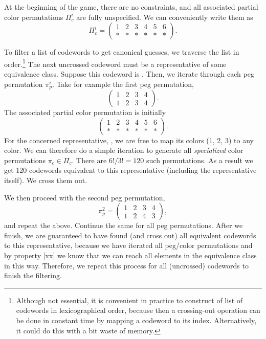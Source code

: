 At the beginning of the game, there are no constraints, and all associated partial color permutations $\Pi_c^i$ are fully unspecified. We can conveniently write them as
\[
\Pi_c^i = 
\begin{pmatrix}
1 & 2 & 3 & 4 & 5 & 6 \\
* & * & * & * & * & * 
\end{pmatrix} .
\]

To filter a list of codewords to get canonical guesses, we traverse the list in order.\footnote{Although not essential, it is convenient in practice to construct of list of codewords in lexicographical order, because then a crossing-out operation can be done in constant time by mapping a codeword to its index. Alternatively, it could do this with a bit waste of memory.} 
The next uncrossed codeword must be a representative of some equivalence class. Suppose this codeword is . Then, we iterate through each peg permutation $\pi_p^i$. Take for example the first peg permutation,
\[
\begin{pmatrix}
1 & 2 & 3 & 4 \\
1 & 2 & 3 & 4
\end{pmatrix} .
\]
The associated partial color permutation is initially
\[
\begin{pmatrix}
1 & 2 & 3 & 4 & 5 & 6 \\
* & * & * & * & * & * 
\end{pmatrix} .
\]
For the concerned representative, , we are free to map its colors (1, 2, 3) to any color. We can therefore do a simple iteration to generate all \emph{specialized} color permutations $\pi_c \in \Pi_c$. There are $6! / 3! = 120$ such permutations. As a result we get 120 codewords equivalent to this representative (including the representative itself). We cross them out.

We then proceed with the second peg permutation,
\[
\pi_p^2 = 
\begin{pmatrix}
1 & 2 & 3 & 4 \\
1 & 2 & 4 & 3
\end{pmatrix} ,
\] 
and repeat the above. Continue the same for all peg permutations. After we finish, we are guaranteed to have found (and cross out) all equivalent codewords to this representative, because we have iterated all peg/color permutations and by property [xx] we know that we can reach all elements in the equivalence class in this way. Therefore, we repeat this process for all (uncrossed) codewords to finish the filtering.

